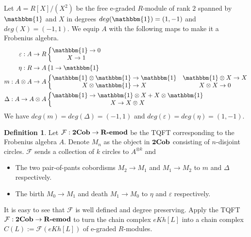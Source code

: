 \documentclass{amsart}
\theoremstyle{plain}
\theoremstyle{definition}
\newtheorem{definition}[theorem]{Definition}
\theoremstyle{definition}
\numberwithin{equation}{section}
\numberwithin{theorem}{section}
\newcommand{\cat}[1]{\ensuremath{\mbox{\bfseries {\upshape {#1}}}}}
\renewcommand{\to}{\rightarrow}
\numberwithin{equation}{section}
\def\1{\mathbbm{1}}%
\begin{document}
Let $A=R[X]/(X^2)$ be the free e-graded $R$-module of rank $2$ spanned by $\1$ and $X$ in degrees $deg(\1)=(1,-1)$ and $deg(X)=(-1,1)$.
We equip $A$ with the following maps to make it a Frobenius algebra.
\begin{align}\label{Frob-str-1}
  \varepsilon: A\to R & \left\{\begin{matrix}
                                \1 \to 0 \\
                                X\to 1
                              \end{matrix} \right.\\
  \eta: R \to A & \left\{ 1\to \1 \right. \\
  m:A\otimes A \to A & \left\{  \begin{matrix}
                                  \1 \otimes \1 \to \1 & \1\otimes X \to X \\
                                  X\otimes \1 \to X & X\otimes X \to 0
                                \end{matrix}  \right. \\
  \Delta: A\to A\otimes A & \left\{ \begin{matrix}
                                      \1 \to \1\otimes X + X \otimes \1 \\
                                      X \to X \otimes X
                                    \end{matrix}\right.
\end{align}
We have $deg(m)=deg(\Delta)=(-1,1)$ and $deg(\varepsilon)=deg(\eta)=(1,-1)$.

\begin{definition}
  Let $\mathcal{F}:\cat{2Cob} \to \cat{R-emod}$ be the TQFT corresponding to the Frobenius algebra $A$. Denote $M_n$ as the object in $\cat{2Cob}$ consisting of $n$-disjoint circles. $\mathcal{F}$ sends a collection of $k$ circles to $A^{\otimes k}$ and
  \begin{itemize}
    \item The two pair-of-pants cobordisms $M_2\to M_1$ and $M_1\to M_2$ to $m$ and $\Delta$ respectively.
    \item The birth $M_0 \to M_1$ and death $M_1 \to M_0$ to $\eta$ and $\varepsilon$ respectively.
  \end{itemize}
\end{definition}
It is easy to see that $\mathcal{F}$ is well defined and degree preserving.
Apply the TQFT $\mathcal{F}:\cat{2Cob} \to \cat{R-emod}$ to turn the chain complex $eKh[L]$ into a chain complex $C(L):=\mathcal{F}(eKh[L])$ of e-graded $R$-modules.
\end{document}
